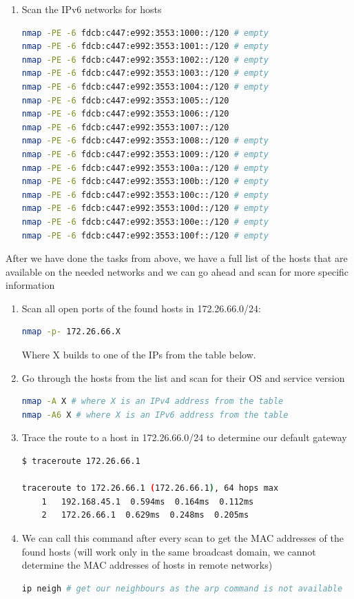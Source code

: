 \begin{enumerate}
    \item Scan the IPv6 networks for hosts
    \begin{lstlisting}[language=bash,numbers=none]
nmap -PE -6 fdcb:c447:e992:3553:1000::/120 # empty
nmap -PE -6 fdcb:c447:e992:3553:1001::/120 # empty
nmap -PE -6 fdcb:c447:e992:3553:1002::/120 # empty
nmap -PE -6 fdcb:c447:e992:3553:1003::/120 # empty
nmap -PE -6 fdcb:c447:e992:3553:1004::/120 # empty
nmap -PE -6 fdcb:c447:e992:3553:1005::/120
nmap -PE -6 fdcb:c447:e992:3553:1006::/120
nmap -PE -6 fdcb:c447:e992:3553:1007::/120
nmap -PE -6 fdcb:c447:e992:3553:1008::/120 # empty
nmap -PE -6 fdcb:c447:e992:3553:1009::/120 # empty
nmap -PE -6 fdcb:c447:e992:3553:100a::/120 # empty
nmap -PE -6 fdcb:c447:e992:3553:100b::/120 # empty
nmap -PE -6 fdcb:c447:e992:3553:100c::/120 # empty
nmap -PE -6 fdcb:c447:e992:3553:100d::/120 # empty
nmap -PE -6 fdcb:c447:e992:3553:100e::/120 # empty
nmap -PE -6 fdcb:c447:e992:3553:100f::/120 # empty
    \end{lstlisting}
\end{enumerate}

After we have done the tasks from above, we have a full list of the hosts that are available on the needed networks
and we can go ahead and scan for more specific information

\begin{enumerate}
    \item Scan all open ports of the found hosts in 172.26.66.0/24:
    \begin{lstlisting}[language=bash,numbers=none]
nmap -p- 172.26.66.X
    \end{lstlisting}
    Where X builds to one of the IPs from the table below.

    \item Go through the hosts from the list and scan for their OS and service version
    \begin{lstlisting}[language=bash,numbers=none]
nmap -A X # where X is an IPv4 address from the table
nmap -A6 X # where X is an IPv6 address from the table
    \end{lstlisting}

    \item Trace the route to a host in 172.26.66.0/24 to determine our default gateway
    \begin{lstlisting}[language=bash,numbers=none]
$ traceroute 172.26.66.1

traceroute to 172.26.66.1 (172.26.66.1), 64 hops max
    1   192.168.45.1  0.594ms  0.164ms  0.112ms
    2   172.26.66.1  0.629ms  0.248ms  0.205ms
    \end{lstlisting}

    \item We can call this command after every scan to get the MAC addresses of the found hosts
    (will work only in the same broadcast domain, we cannot determine the MAC addresses of hosts in remote networks)
    \begin{lstlisting}[language=bash,numbers=none]
ip neigh # get our neighbours as the arp command is not available
    \end{lstlisting}

\end{enumerate}

